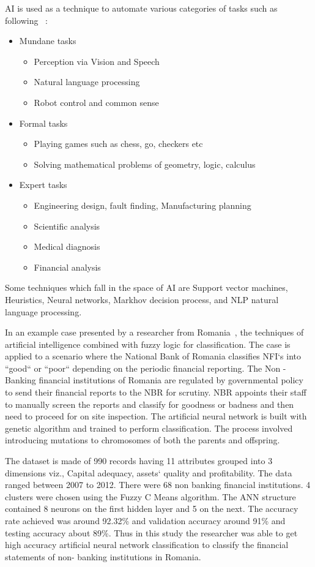 AI is used as a technique to automate various categories of tasks such as following~ :
\begin{itemize}
	\item Mundane tasks
		\begin{itemize}
			\item Perception via Vision and Speech
			\item Natural language processing 
			\item Robot control and common sense
		\end{itemize}
	\item Formal tasks
	\begin{itemize}
		\item Playing games such as chess, go, checkers etc
		\item Solving mathematical problems of geometry, logic, calculus
	\end{itemize}
	\item Expert tasks
	\begin{itemize}
		\item Engineering design, fault finding, Manufacturing planning
		\item Scientific analysis
		\item Medical diagnosis
		\item Financial analysis
	\end{itemize}
\end{itemize}

Some techniques which fall in the space of AI are Support vector machines, Heuristics, Neural networks, Markhov decision process, and NLP natural language processing.

In an example case presented by a researcher from Romania~, the techniques of artificial intelligence combined with fuzzy logic for classification.
The case is applied to a scenario where the National Bank of Romania classifies NFI`s into ``good`` or ``poor`` depending on the periodic financial reporting. The Non - Banking financial institutions of Romania are regulated by governmental policy to send their financial reports to the NBR for scrutiny. NBR appoints their staff to manually screen the reports and classify for goodness or badness and then need to proceed for on site inspection.
The artificial neural network is built with genetic algorithm and trained to perform classification. The process involved introducing mutations to chromosomes of both the parents and offspring.

The dataset is made of 990 records having 11 attributes grouped into 3 dimensions viz., Capital adequacy, assets` quality and profitability. The data ranged between 2007 to 2012. There were 68 non banking financial institutions. 4 clusters were chosen using the Fuzzy C Means algorithm. The ANN structure contained 8 neurons on the first hidden layer and 5 on the next. The accuracy rate achieved was around 92.32\% and validation accuracy around 91\% and testing accuracy about 89\%. Thus in this study the researcher was able to get high accuracy artificial neural network classification to classify the financial statements of non- banking institutions in Romania.


